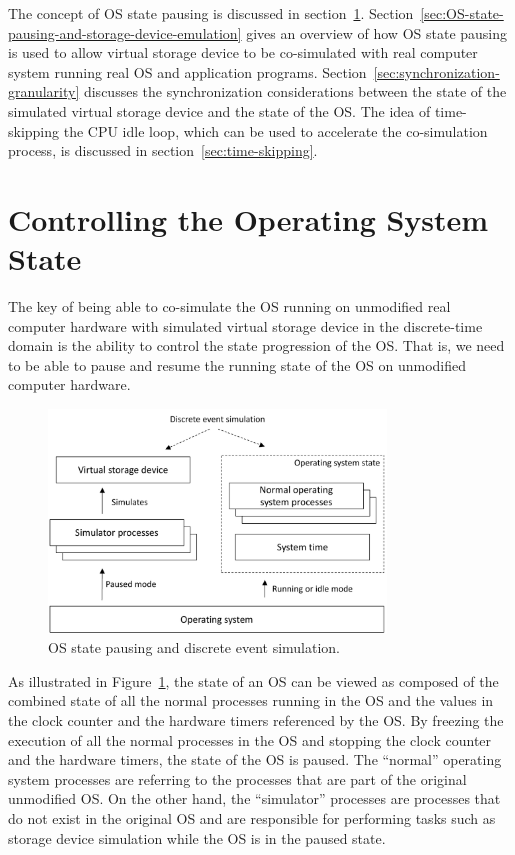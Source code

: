 The concept of OS state pausing is discussed in section~\ref{sec:controlling-OS-state}. Section~\ref{sec:OS-state-pausing-and-storage-device-emulation} gives an overview of how OS state pausing is used to allow virtual storage device to be co-simulated with real computer system running real OS and application programs. Section~\ref{sec:synchronization-granularity} discusses the synchronization considerations between the state of the simulated virtual storage device and the state of the OS. The idea of time-skipping the CPU idle loop, which can be used to accelerate the co-simulation process, is discussed in section~\ref{sec:time-skipping}.

\section{Controlling the Operating System State}
\label{sec:controlling-OS-state}

The key of being able to co-simulate the OS running on unmodified real computer hardware with simulated virtual storage device in the discrete-time domain is the ability to control the state progression of the OS. That is, we need to be able to pause and resume the running state of the OS on unmodified computer hardware.

\begin{figure}[htpb]
	\centering
	\includegraphics[width=0.8\textwidth]{figures/ch3-OS-state.pdf}
	\caption{\label{fig:ch3-OS-state}OS state pausing and discrete event simulation.}
\end{figure}

As illustrated in Figure~\ref{fig:ch3-OS-state}, the state of an OS can be viewed as composed of the combined state of all the normal processes running in the OS and the values in the clock counter and the hardware timers referenced by the OS. By freezing the execution of all the normal processes in the OS and stopping the clock counter and the hardware timers, the state of the OS is paused. The ``normal'' operating system processes are referring to the processes that are part of the original unmodified OS. On the other hand, the ``simulator'' processes are processes that do not exist in the original OS and are responsible for performing tasks such as storage device simulation while the OS is in the paused state.

